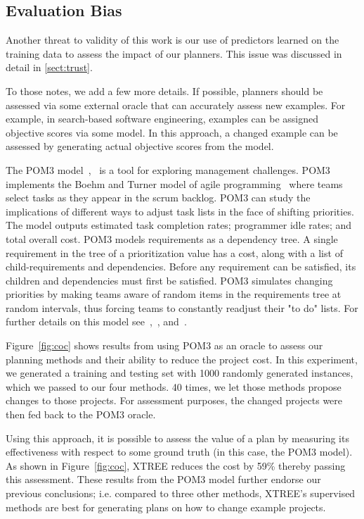\documentclass{sig-alternate}
\newcommand{\tion}[1]{\textsection\ref{sect:#1}}
\newcommand{\fig}[1]{Figure~\ref{fig:#1}}
\begin{document}
{\begin{itemize}[leftmargin=3mm]
\subsection{  Evaluation Bias}\label{sect:coc}
Another threat to validity of this work is our use
of predictors learned on the training data to assess the impact of our planners.
This issue was discussed in detail in \tion{trust}. 

To those notes, we add a few more details. If possible, planners should be assessed via some external oracle that can accurately assess new examples. For example, in search-based software engineering,
examples can be assigned objective scores via  some model. In this approach, a changed example can be assessed by
generating actual objective scores from the model. 



The POM3 model~\cite{boehm2003using},~\cite{port2008} is a tool for exploring management challenges. POM3 implements the Boehm and Turner model of agile programming~\cite{boehm2003balancing} where teams select tasks as they appear in the scrum backlog.  POM3 can study the implications of different ways to adjust task lists in the face of shifting priorities. The model outputs estimated task completion rates; programmer idle rates; and total overall cost. POM3 models requirements as a dependency tree. A single requirement in the tree of a prioritization value has a cost, along with a list of child-requirements and dependencies. Before any requirement can be satisfied, its children and dependencies must first be satisfied. POM3 simulates changing priorities by making teams aware of random items in the requirements tree at random intervals, thus forcing teams to constantly readjust their "to do" lists. For further details on this model see~\cite{boehm2003using},~\cite{port2008}, and~\cite{boehm2003balancing}. 

\fig{coc} shows results from using POM3 as an oracle to assess our planning methods and their ability to reduce the project cost. In this experiment, we generated a training and testing set with 1000 randomly generated instances, which we passed to our four methods.
40 times, we let those methods propose changes to those projects. 
For assessment purposes, the changed projects were then fed back to the POM3
oracle. 

Using this approach, it is possible to assess the value of a plan by measuring its
effectiveness with respect to some ground truth (in this case, the POM3 model).
As shown in \fig{coc}, XTREE reduces the cost by 59\% thereby passing this assessment. These results from the POM3 model further endorse our previous conclusions; i.e. compared to three other methods,  XTREE's supervised methods are best for generating plans on how to change example projects.
 

\end{itemize}}
\end{document}
